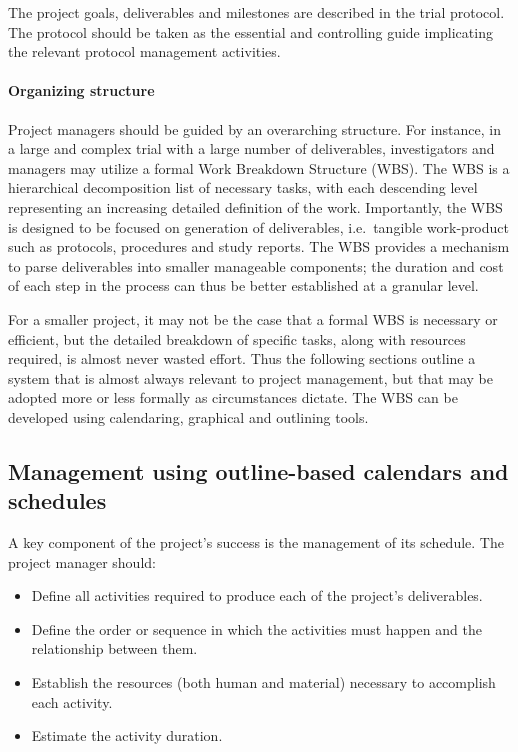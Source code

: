 \documentclass[]{book}
\providecommand{\tightlist}{%
  \setlength{\itemsep}{0pt}\setlength{\parskip}{0pt}}
\theoremstyle{definition}
\theoremstyle{definition}
\theoremstyle{definition}
\theoremstyle{remark}
\begin{document}
The project goals, deliverables and milestones are described in the
trial protocol. The protocol should be taken as the essential and
controlling guide implicating the relevant protocol management
activities.

\paragraph{Organizing structure}\label{organizing-structure}

Project managers should be guided by an overarching structure. For
instance, in a large and complex trial with a large number of
deliverables, investigators and managers may utilize a formal Work
Breakdown Structure (WBS). The WBS is a hierarchical decomposition list
of necessary tasks, with each descending level representing an
increasing detailed definition of the work. Importantly, the WBS is
designed to be focused on generation of deliverables, i.e.~tangible
work-product such as protocols, procedures and study reports. The WBS
provides a mechanism to parse deliverables into smaller manageable
components; the duration and cost of each step in the process can thus
be better established at a granular level.

For a smaller project, it may not be the case that a formal WBS is
necessary or efficient, but the detailed breakdown of specific tasks,
along with resources required, is almost never wasted effort. Thus the
following sections outline a system that is almost always relevant to
project management, but that may be adopted more or less formally as
circumstances dictate. The WBS can be developed using calendaring,
graphical and outlining tools.

\subsection{Management using outline-based calendars and
schedules}\label{management-using-outline-based-calendars-and-schedules}

A key component of the project's success is the management of its
schedule. The project manager should:

\begin{itemize}
\tightlist
\item
  Define all activities required to produce each of the project's
  deliverables.
\item
  Define the order or sequence in which the activities must happen and
  the relationship between them.
\item
  Establish the resources (both human and material) necessary to
  accomplish each activity.
\item
  Estimate the activity duration.
\end{itemize}
\end{document}
